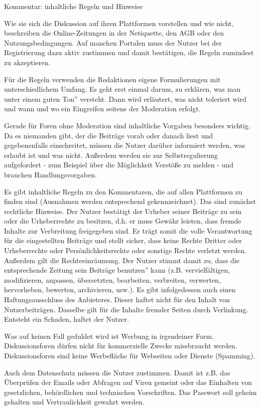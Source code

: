 Kommentar: inhaltliche Regeln und Hinweise

Wie sie sich die Diskussion auf ihren Plattformen vorstellen und wie nicht, beschreiben die Online-Zeitungen in der Netiquette, den AGB oder den Nutzungsbedingungen. Auf manchen Portalen muss der Nutzer bei der Registrierung dazu aktiv zustimmen und damit bestätigen, die Regeln zumindest zu akzeptieren. 

Für die Regeln verwenden die Redaktionen eigene Formulierungen mit unterschiedlichem Umfang. Es geht erst einmal darum, zu erklären, was man unter einem \glqq guten Ton'' versteht. Dann wird erläutert, was nicht toleriert wird und wann und wo ein Eingreifen seitens der Moderation erfolgt. 

Gerade für Foren ohne Moderation sind inhaltliche Vorgaben besonders wichtig. Da es niemanden gibt, der die Beiträge vorab oder danach liest und gegebenenfalls einschreitet, müssen die Nutzer darüber informiert werden, was erlaubt ist und was nicht. Außerdem werden sie zur Selbstregulierung aufgefordert - zum Beispiel über die Möglichkeit Verstöße zu melden - und brauchen Handlungsvorgaben.

Es gibt inhaltliche Regeln zu den Kommentaren, die auf allen Plattformen zu finden sind (Ausnahmen werden entsprechend gekennzeichnet). 
Das sind zunächst rechtliche Hinweise. Der Nutzer bestätigt der Urheber seiner Beiträge zu sein oder die Urheberrechte zu besitzen, d.h. er muss Gewähr leisten, dass fremde Inhalte zur Verbreitung freigegeben sind. Er trägt somit die volle Verantwortung für die eingestellten Beiträge und stellt sicher, dass keine Rechte Dritter oder Urheberrechte oder Persönlichkeitsrechte oder sonstige Rechte verletzt werden. Außerdem gilt die Rechteeinräumung. Der Nutzer stimmt damit zu, dass die entsprechende Zeitung sein Beiträge \glqq benutzen'' kann (z.B. vervielfältigen, modifizieren, anpassen, übersetzten, bearbeiten, verbreiten, verwerten, hervorheben, bewerten, archivieren, usw.). 
Es gibt infolgedessen auch einen Haftungsausschluss des Anbieteres. Dieser haftet nicht für den Inhalt von Nutzerbeiträgen. Dasselbe gilt für die Inhalte fremder Seiten durch Verlinkung. Entsteht ein Schaden, haftet der Nutzer. 

Was auf keinen Fall geduldet wird ist Werbung in irgendeiner Form. Diskussionsforen dürfen nicht für kommerzielle Zwecke missbraucht werden. Diskussionsforen sind keine Werbefläche für Webseiten oder Dienste (Spamming). 

Auch dem Datenschutz müssen die Nutzer zustimmen. Damit ist z.B. das Überprüfen der Emails oder Abfragen auf Viren gemeint oder das Einhalten von gesetzlichen, behördlichen und technischen Vorschriften. Das Passwort soll geheim gehalten und Vertraulichkeit gewahrt werden. 

